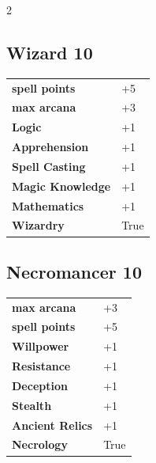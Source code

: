 \begin{multicols}{2}
\begin{tcolorbox}

\end{tcolorbox}

\begin{tcolorbox}
    \subsection*{Wizard \hfill \small{10 }}
    \tcblower




\begin{tabular}{@{}ll@{}}
    \textbf{spell points} & +5\\
    \textbf{max arcana} & +3\\
    \textbf{Logic} & +1\\
    \textbf{Apprehension} & +1\\
    \textbf{Spell Casting} & +1\\
    \textbf{Magic Knowledge} & +1\\
    \textbf{Mathematics} & +1\\
    \textbf{Wizardry} & True\\
\end{tabular}


\end{tcolorbox}

\begin{tcolorbox}
    \subsection*{Necromancer \hfill \small{10 }}
    \tcblower




\begin{tabular}{@{}ll@{}}
    \textbf{max arcana} & +3\\
    \textbf{spell points} & +5\\
    \textbf{Willpower} & +1\\
    \textbf{Resistance} & +1\\
    \textbf{Deception} & +1\\
    \textbf{Stealth} & +1\\
    \textbf{Ancient Relics} & +1\\
    \textbf{Necrology} & True\\
\end{tabular}


\end{tcolorbox}
\end{multicols}
